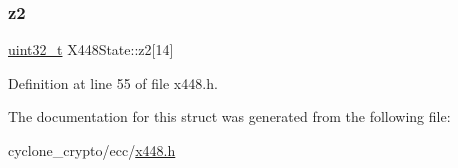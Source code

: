 \mbox{\label{structX448State_a5347ad257da43817a6c521a0a383eb14}} 
\subsubsection{\texorpdfstring{z2}{z2}}
{\footnotesize\ttfamily \hyperlink{stdint_8h_a435d1572bf3f880d55459d9805097f62}{uint32\+\_\+t} X448\+State\+::z2\mbox{[}14\mbox{]}}



Definition at line 55 of file x448.\+h.



The documentation for this struct was generated from the following file\+:\begin{DoxyCompactItemize}
\item 
cyclone\+\_\+crypto/ecc/\hyperlink{x448_8h}{x448.\+h}\end{DoxyCompactItemize}
